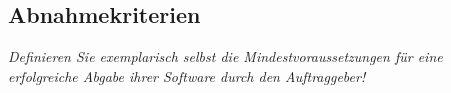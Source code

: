 \subsection{Abnahmekriterien}

\textit{
    Definieren Sie exemplarisch selbst die Mindestvoraussetzungen für eine erfolgreiche Abgabe ihrer Software durch den Auftraggeber!
}


